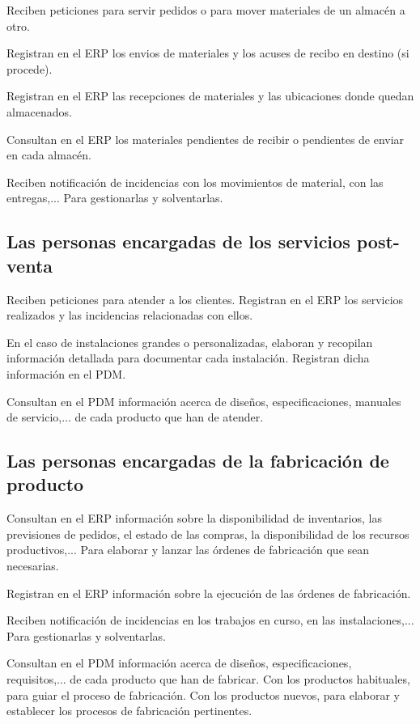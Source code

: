 \documentclass[spanish,12pt,a4paper,final,oneside]{book}
\begin{document}
Reciben peticiones para servir pedidos o para mover materiales de un almacén a otro.

Registran en el ERP los envios de materiales y los acuses de recibo en destino (si procede). 

Registran en el ERP las recepciones de materiales y las ubicaciones donde quedan almacenados.

Consultan en el ERP los materiales pendientes de recibir o pendientes de enviar en cada almacén.  

Reciben notificación de incidencias con los movimientos de material, con las entregas,... Para gestionarlas y solventarlas.

\subsection{Las personas encargadas de los servicios post-venta}

Reciben peticiones para atender a los clientes. Registran en el ERP los servicios realizados y las incidencias relacionadas con ellos.

En el caso de instalaciones grandes o personalizadas, elaboran y recopilan información detallada para documentar cada instalación. Registran dicha información en el PDM.

Consultan en el PDM información acerca de diseños, especificaciones, manuales de servicio,... de cada producto que han de atender.

\subsection{Las personas encargadas de la fabricación de producto}

Consultan en el ERP información sobre la disponibilidad de inventarios, las previsiones de pedidos, el estado de las compras, la disponibilidad de los recursos productivos,... Para elaborar y lanzar las órdenes de fabricación que sean necesarias.

Registran en el ERP información sobre la ejecución de las órdenes de fabricación.

Reciben notificación de incidencias en los trabajos en curso, en las instalaciones,... Para gestionarlas y solventarlas.

Consultan en el PDM información acerca de diseños, especificaciones, requisitos,... de cada producto que han de fabricar. Con los productos habituales, para guiar el proceso de fabricación. Con los productos nuevos, para elaborar y establecer los procesos de fabricación pertinentes.
\end{document}
